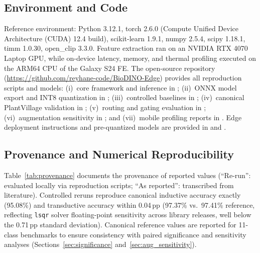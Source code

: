 \documentclass[preprint,12pt]{elsarticle}
\begin{document}
\subsection{Environment and Code}
Reference environment: Python 3.12.1, torch 2.6.0 (Compute Unified Device Architecture (CUDA) 12.4 build), scikit-learn 1.9.1, numpy 2.5.4, scipy 1.18.1, timm 1.0.30, open\_clip 3.3.0. Feature extraction ran on an NVIDIA RTX 4070 Laptop GPU, while on-device latency, memory, and thermal profiling executed on the ARM64 CPU of the Galaxy S24 FE. The open-source repository (\url{https://github.com/reyhane-code/BioDINO-Edge}) provides all reproduction scripts and models: (i)~core framework and inference in ; (ii)~ONNX model export and INT8 quantization in ; (iii)~controlled baselines in ; (iv)~canonical PlantVillage validation in ; (v)~routing and gating evaluation in ; (vi)~augmentation sensitivity in ; and (vii)~mobile profiling reports in . Edge deployment instructions and pre-quantized models are provided in  and .

\subsection{Provenance and Numerical Reproducibility}
Table~\ref{tab:provenance} documents the provenance of reported values (``Re-run'': evaluated locally via reproduction scripts; ``As reported'': transcribed from literature). Controlled reruns reproduce canonical inductive accuracy exactly (95.08\%) and transductive accuracy within 0.04\,pp (97.37\% vs.\ 97.41\% reference, reflecting \texttt{lsqr} solver floating-point sensitivity across library releases, well below the 0.71\,pp standard deviation). Canonical reference values are reported for 11-class benchmarks to ensure consistency with paired significance and sensitivity analyses (Sections~\ref{sec:significance} and~\ref{sec:aug_sensitivity}).
\end{document}
